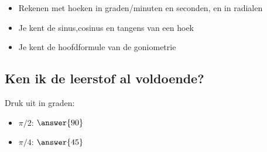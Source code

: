 \documentclass{ximera}
\begin{document}
\begin{foldable}
	\begin{itemize}
		\item Rekenen met hoeken in graden/minuten en seconden, en in radialen
		\item Je kent de sinus,cosinus en tangens van een hoek
		\item Je kent de hoofdformule van de goniometrie
	\end{itemize}
\end{foldable}

\subsection{Ken ik de leerstof al voldoende?}
\begin{foldable}
	\begin{problem}
		  Druk uit in graden:
		  \begin{itemize}
	              \item $\pi/2$: $\answer{90}$
	              \item $\pi/4$: $\answer{45}$
		  \end{itemize}
	\end{problem}
\end{foldable}
\end{document}

